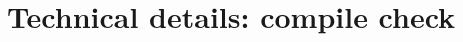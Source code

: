
\title{Technical details: compile check}
\author{}
\date{}
\renewcommand{\thetable}{S\arabic{table}}

\maketitle


